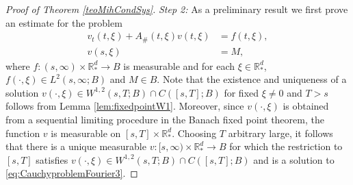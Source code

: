 \documentclass{amsart}
\theoremstyle{plain}
\theoremstyle{remark}
\theoremstyle{plain}
\numberwithin{equation}{section}
\begin{document}
\begin{proof}[Proof of Theorem \ref{teoMihCondSys}]
{\em Step 2:}  As a preliminary result we first prove an estimate for the problem
\begin{equation}\label{eq:CauchyproblemFourier3}
\begin{aligned}
  v_t(t,\xi) + A_{\#}(t,\xi) v(t,\xi) & = f(t,\xi),
 \\  v(s,\xi) &= M,
\end{aligned}
\end{equation}
where $f:(s,\infty)\times{ \mathbb{R} }^d_*\to B$ is measurable and for each $\xi\in { \mathbb{R} }^d_*$, $f(\cdot, \xi)\in L^2(s,\infty;B)$ and $M\in B$.
Note that the existence and uniqueness of a solution $v(\cdot, \xi) \in W^{1,2}(s,T;B)\cap C([s,T];B)$ for fixed $\xi\neq 0$ and $T>s$ follows from Lemma \ref{lem:fixedpointW1}. Moreover, since $v(\cdot, \xi)$ is obtained from a sequential limiting procedure in the Banach fixed point theorem, the function $v$ is measurable on $[s, T] \times { \mathbb{R} }^d_*$. Choosing $T$ arbitrary large, it follows that there is a unique measurable $v:[s, \infty)\times { \mathbb{R} }^d_*\to B$ for which the restriction to $[s,T]$ satisfies $v(\cdot, \xi) \in W^{1,2}(s,T;B)\cap C([s,T];B)$ and is a solution to \eqref{eq:CauchyproblemFourier3}.


\end{proof}
\end{document}

